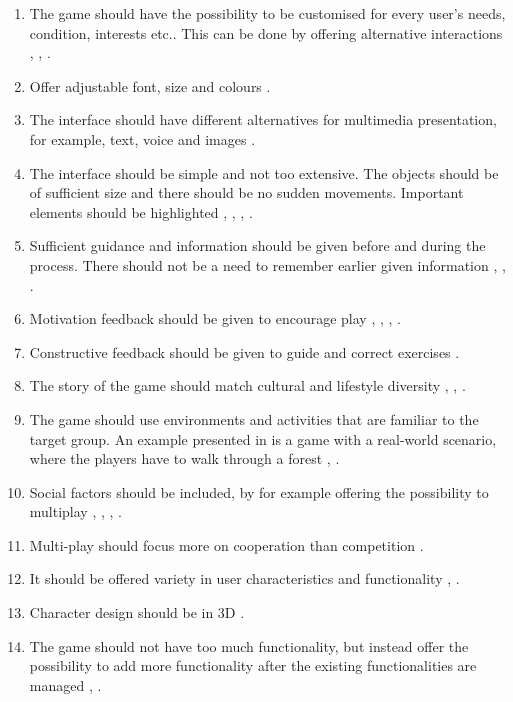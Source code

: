 \begin{enumerate}[{g}.1]
\renewcommand{\labelitemi}{$\bullet$}
\item The game should have the possibility to be customised for every user's needs, condition, interests etc.. This can be done by offering alternative interactions \cite{Billis}, \cite{gregor}, \cite{gerling1}.
\item Offer adjustable font, size and colours \cite{Billis}.
\item The interface should have different alternatives for multimedia presentation, for example, text, voice and images \cite{Billis}.
\item The interface should be simple and not too extensive. The objects should be of sufficient size and there should be no sudden movements. Important elements should be highlighted \cite{Billis}, \cite{gerling1}, \cite{gerling2}, \cite{exergamesforelderly}.
\item Sufficient guidance and information should be given before and during the process. There should not be a need to remember earlier given information \cite{Billis}, \cite{gregor}, \cite{john2012smartsenior}.
\item Motivation feedback should be given to encourage play \cite{Billis}, \cite{gerling1}, \cite{exergamesforelderly}, \cite{john2012smartsenior}.
\item Constructive feedback should be given to guide and correct exercises \cite{john2012smartsenior}. 
\item The story of the game should match cultural and lifestyle diversity \cite{Billis}, \cite{gregor}, \cite{gerling2}. 
\item The game should use environments and activities that are familiar to the target group. An example presented in \cite{gerling2} is a game with a real-world scenario, where the players have to walk through a forest \cite{john2012smartsenior}, \cite{gerling2}.
\item Social factors should be included, by for example offering the possibility to multiplay \cite{Billis}, \cite{gerling2}, \cite{gerling1}, \cite{exergamesforelderly}.
\item Multi-play should focus more on cooperation than competition \cite{Gajadhar}.
\item It should be offered variety in user characteristics and functionality \cite{gregor}, \cite{gerling1}.
\item Character design should be in 3D \cite{john2012smartsenior}.
\item The game should not have too much functionality, but instead offer the possibility to add more functionality after the existing functionalities are managed \cite{gregor}, \cite{gerling2}.

\end{enumerate}
